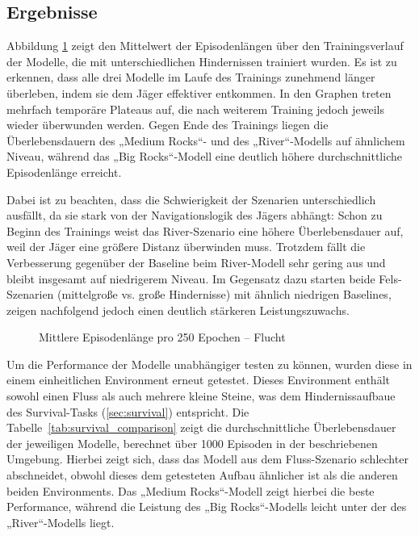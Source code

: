 \subsection{Ergebnisse}
Abbildung \ref{fig:episode_lengths} zeigt den Mittelwert der Episodenlängen über den Trainingsverlauf der Modelle, die mit unterschiedlichen Hindernissen trainiert wurden. Es ist zu erkennen, dass alle drei Modelle im Laufe des Trainings zunehmend länger überleben, indem sie dem Jäger effektiver entkommen. In den Graphen treten mehrfach temporäre Plateaus auf, die nach weiterem Training jedoch jeweils wieder überwunden werden. Gegen Ende des Trainings liegen die Überlebensdauern des „Medium Rocks“- und des „River“-Modells auf ähnlichem Niveau, während das „Big Rocks“-Modell eine deutlich höhere durchschnittliche Episodenlänge erreicht.

Dabei ist zu beachten, dass die Schwierigkeit der Szenarien unterschiedlich ausfällt, da sie stark von der Navigationslogik des Jägers abhängt: Schon zu Beginn des Trainings weist das River-Szenario eine höhere Überlebensdauer auf, weil der Jäger eine größere Distanz überwinden muss. Trotzdem fällt die Verbesserung gegenüber der Baseline beim River-Modell sehr gering aus und bleibt insgesamt auf niedrigerem Niveau. Im Gegensatz dazu starten beide Fels-Szenarien (mittelgroße vs. große Hindernisse) mit ähnlich niedrigen Baselines, zeigen nachfolgend jedoch einen deutlich stärkeren Leistungszuwachs.
\begin{figure}[htbp]
  \centering
  \caption{Mittlere Episodenlänge pro 250 Epochen – Flucht}
  \label{fig:episode_lengths}
\end{figure}

Um die Performance der Modelle unabhängiger testen zu können, wurden diese in einem einheitlichen Environment erneut getestet. Dieses Environment enthält sowohl einen Fluss als auch mehrere kleine Steine, was dem Hindernissaufbaue des Survival-Tasks (\ref{sec:survival}) entspricht. Die Tabelle~\ref{tab:survival_comparison} zeigt die durchschnittliche Überlebensdauer der jeweiligen Modelle, berechnet über 1000 Episoden in der beschriebenen Umgebung. Hierbei zeigt sich, dass das Modell aus dem Fluss-Szenario schlechter abschneidet, obwohl dieses dem getesteten Aufbau ähnlicher ist als die anderen beiden Environments. Das „Medium Rocks“-Modell zeigt hierbei die beste Performance, während die Leistung des „Big Rocks“-Modells leicht unter der des „River“-Modells liegt.


